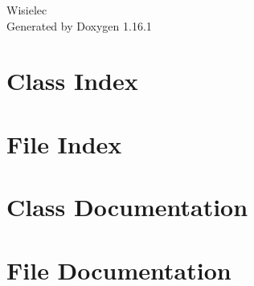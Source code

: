 \documentclass[twoside]{book}
\newcommand{\+}{\discretionary{\mbox{\scriptsize$\hookleftarrow$}}{}{}}
\newcommand{\clearemptydoublepage}{%
    \newpage{\pagestyle{empty}\cleardoublepage}%
  }
\begin{document}
  \raggedbottom
    \hypersetup{pageanchor=false,
                bookmarksnumbered=true,
                pdfencoding=unicode
               }
  \begin{titlepage}
  \vspace*{7cm}
  \begin{center}%
  {\Large Wisielec}\\
  \vspace*{1cm}
  {\large Generated by Doxygen 1.16.1}\\
  \end{center}
  \end{titlepage}
  \clearemptydoublepage
  \tableofcontents
  \clearemptydoublepage
  \hypersetup{pageanchor=true}
\chapter{Class Index}

\chapter{File Index}

\chapter{Class Documentation}


\chapter{File Documentation}


  \backmatter
  \newpage
  \clearemptydoublepage
  \printindex
\end{document}
